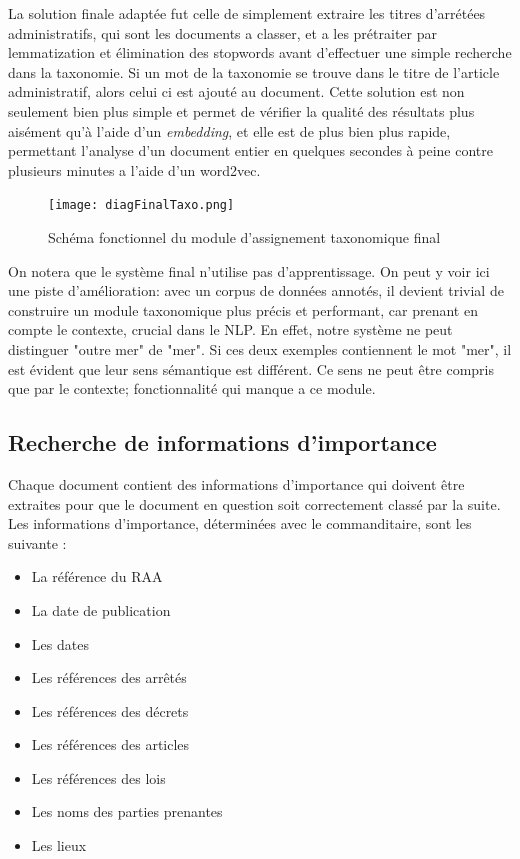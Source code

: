 La solution finale adaptée fut celle de simplement extraire les titres d'arrétées administratifs, qui sont les documents a classer, et a les prétraiter par lemmatization et élimination des stopwords avant d'effectuer une simple recherche dans la taxonomie.
Si un mot de la taxonomie se trouve dans le titre de l'article administratif, alors celui ci est ajouté au document.
Cette solution est non seulement bien plus simple et permet de vérifier la qualité des résultats plus aisément qu'à l'aide d'un \textit{embedding}, et elle est de plus bien plus rapide, permettant l'analyse d'un document entier en quelques secondes à peine contre plusieurs minutes a l'aide d'un word2vec.

\begin{figure}[h!]
  \centering
  \texttt{[image: diagFinalTaxo.png]}
	\caption[]{Schéma fonctionnel du module d'assignement taxonomique final}
  \label{taxoFinal}
\end{figure}

On notera que le système final n'utilise pas d'apprentissage.
On peut y voir ici une piste d'amélioration: avec un corpus de données annotés, il devient trivial de construire un module taxonomique plus précis et performant, car prenant en compte le contexte, crucial dans le NLP.
En effet, notre système ne peut distinguer "outre mer" de "mer". Si ces deux exemples contiennent le mot "mer", il est évident que leur sens sémantique est différent.
Ce sens ne peut être compris que par le contexte; fonctionnalité qui manque a ce module. 




\subsection{Recherche de informations d'importance} %
Chaque document contient des informations d'importance qui doivent être extraites pour que le document en question soit correctement classé par la suite.
Les informations d'importance, déterminées avec le commanditaire, sont les suivante :
\begin {itemize}
\item La référence du RAA
\item La date de publication
\item Les dates
\item Les références des arrêtés
\item Les références des décrets
\item Les références des articles
\item Les références des lois
\item Les noms des parties prenantes
\item Les lieux
\end {itemize}

